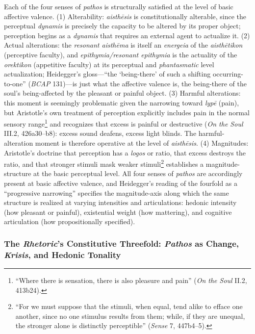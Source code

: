 \documentclass{article}
\begin{document}
Each of the four senses of \textit{pathos} is structurally satisfied at the level of basic affective valence. (1) Alterability: \textit{aisthēsis} is constitutionally alterable, since the perceptual \textit{dynamis} is precisely the capacity to be altered by its proper object; perception begins as a \textit{dynamis} that requires an external agent to actualize it. (2) Actual alterations: the \textit{resonant aisthēma} is itself an \textit{energeia} of the \textit{aisthētikon} (perceptive faculty), and \textit{epithymia/resonant epithymia} is the actuality of the \textit{orektikon} (appetitive faculty) at its perceptual and \textit{phantasmatic} level actualization; Heidegger's gloss---``the `being-there' of such a shifting occurring-to-one'' (\textit{BCAP} 131)---is just what the affective valence is, the being-there of the soul's being-affected by the pleasant or painful object. (3) Harmful alterations: this moment is seemingly problematic given the narrowing toward \textit{lypē} (pain), but Aristotle's own treatment of perception explicitly includes pain in the normal sensory range\footnote{``Where there is sensation, there is also pleasure and pain'' (\textit{On the Soul} II.2, 413b24).} and recognizes that excess is painful or destructive (\textit{On the Soul} III.2, 426a30--b8): excess sound deafens, excess light blinds. The harmful-alteration moment is therefore operative at the level of \textit{aisthēsis}. (4) Magnitudes: Aristotle's doctrine that perception has a \textit{logos} or ratio, that excess destroys the ratio, and that stronger stimuli mask weaker stimuli\footnote{``For we must suppose that the stimuli, when equal, tend alike to efface one another, since no one stimulus results from them; while, if they are unequal, the stronger alone is distinctly perceptible'' (\textit{Sense} 7, 447b4--5).} establishes a magnitude-structure at the basic perceptual level. All four senses of \textit{pathos} are accordingly present at basic affective valence, and Heidegger's reading of the fourfold as a ``progressive narrowing'' specifies the magnitude-axis along which the same structure is realized at varying intensities and articulations: hedonic intensity (how pleasant or painful), existential weight (how mattering), and cognitive articulation (how propositionally specified).

\subsubsection{The \textit{Rhetoric}'s Constitutive Threefold: \textit{Pathos} as Change, \textit{Krisis}, and Hedonic Tonality}
\end{document}
